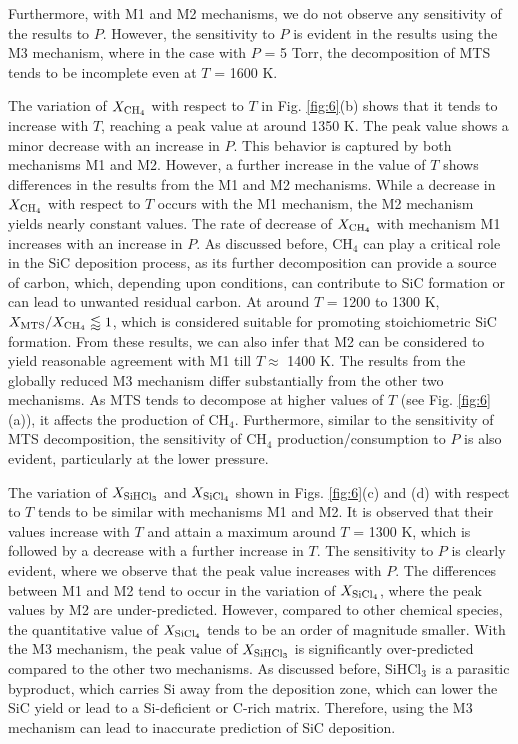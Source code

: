 \documentclass[final, letterpaper, square, comma, numbers, sort&compress]{elsarticle}
\begin{document}
Furthermore, with M1 and M2 mechanisms, we do not observe any sensitivity of the results to $P$. However, the sensitivity to $P$ is evident in the results using the M3 mechanism, where in the case with $P$ = 5 Torr, the decomposition of MTS tends to be incomplete even at $T$ = 1600 K.

The variation of $X_{\rm CH_4}$ with respect to $T$ in Fig. \ref{fig:6}(b) shows that it tends to increase with $T$, reaching a peak value at around 1350 K. The peak value shows a minor decrease with an increase in $P$. This behavior is captured by both mechanisms M1 and M2. However, a further increase in the value of $T$ shows differences in the results from the M1 and M2 mechanisms. While a decrease in $X_{\rm CH_4}$ with respect to $T$ occurs with the M1 mechanism, the M2 mechanism yields nearly constant values. The rate of decrease of $X_{\rm CH_4}$ with mechanism M1 increases with an increase in $P$. As discussed before, CH$_4$ can play a critical role in the SiC deposition process, as its further decomposition can provide a source of carbon, which, depending upon conditions, can contribute to SiC formation or can lead to unwanted residual carbon. At around $T$ = 1200 to 1300 K,
$X_{\rm MTS}/X_{\rm CH_4} \lessapprox 1$, which is considered suitable for promoting stoichiometric SiC formation. From these results, we can also infer that M2 can be considered to yield reasonable agreement with M1 till $T \approx$ 1400 K. The results from the globally reduced M3 mechanism differ substantially from the other two mechanisms. As MTS tends to decompose at higher values of $T$ (see Fig. \ref{fig:6}(a)), it affects the production of CH$_4$. Furthermore, similar to the sensitivity of MTS decomposition, the sensitivity of CH$_4$ production/consumption to $P$ is also evident, particularly at the lower pressure.

The variation of $X_{\rm SiHCl_3}$ and $X_{\rm SiCl_4}$ shown in Figs. \ref{fig:6}(c) and (d) with respect to $T$ tends to be similar with mechanisms M1 and M2. It is observed that their values increase with $T$ and attain a maximum around $T$ = 1300 K, which is followed by a decrease with a further increase in $T$. The sensitivity to $P$ is clearly evident, where we observe that the peak value increases with $P$. The differences between M1 and M2 tend to occur in the variation of $X_{\rm SiCl_4}$, where the peak values by M2 are under-predicted. However, compared to other chemical species, the quantitative value of $X_{\rm SiCl_4}$ tends to be an order of magnitude smaller. With the M3 mechanism, the peak value of $X_{\rm SiHCl_3}$ is significantly over-predicted compared to the other two mechanisms. As discussed before, SiHCl$_3$ is a parasitic byproduct, which carries Si away from the deposition zone, which can lower the SiC yield or lead to a Si-deficient or C-rich matrix. Therefore, using the M3 mechanism can lead to inaccurate prediction of SiC deposition.
\end{document}

